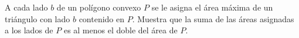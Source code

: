 A cada lado $b$ de un polígono convexo $P$ se le asigna el área máxima de un triángulo con lado $b$ contenido en $P$. Muestra que la suma de las áreas asignadas a los lados de $P$ es al menos el doble del área de $P$.